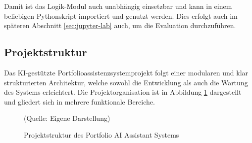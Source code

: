     Damit ist das Logik-Modul auch unabhängig einsetzbar und kann in einem beliebigen Pythonskript importiert und genutzt werden.
    Dies erfolgt auch im späteren Abschnitt \ref{sec:jupyter-lab} auch, um die Evaluation durchzuführen.

    \subsection{Projektstruktur}

      Das KI-gestützte Portfolioassistenzsystemprojekt folgt einer modularen und klar strukturierten Architektur, welche sowohl die Entwicklung als auch die Wartung des Systems erleichtert.
      Die Projektorganisation ist in Abbildung \ref{fig:project_structure} dargestellt und gliedert sich in mehrere funktionale Bereiche.

      \begin{figure}[H]
        \caption{Projektstruktur des Portfolio AI Assistant Systems}
        \small{(Quelle: Eigene Darstellung)}
        \label{fig:project_structure}
      \end{figure}

